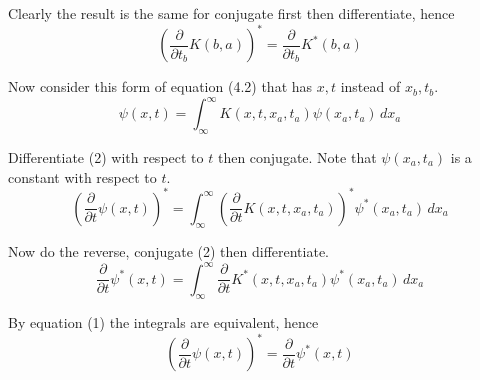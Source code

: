 Clearly the result is the same for conjugate first then differentiate, hence
\begin{equation*}
\left(\frac{\partial}{\partial t_b}K(b,a)\right)^*
=\frac{\partial}{\partial t_b}K^*(b,a)
\tag{1}
\end{equation*}

Now consider this form of equation (4.2) that has $x,t$ instead of $x_b,t_b$.
\begin{equation*}
\psi(x,t)=\int_{\infty}^\infty K(x,t,x_a,t_a)\psi(x_a,t_a)\,dx_a
\tag{2}
\end{equation*}

Differentiate (2) with respect to $t$ then conjugate.
Note that $\psi(x_a,t_a)$ is a constant with respect to $t$.
\begin{equation*}
\left(\frac{\partial}{\partial t}\psi(x,t)\right)^*
=\int_{\infty}^\infty\left(\frac{\partial}{\partial t}K(x,t,x_a,t_a)\right)^*\psi^*(x_a,t_a)\,dx_a
\end{equation*}

Now do the reverse, conjugate (2) then differentiate.
\begin{equation*}
\frac{\partial}{\partial t}\psi^*(x,t)
=\int_{\infty}^\infty\frac{\partial}{\partial t}K^*(x,t,x_a,t_a)\psi^*(x_a,t_a)\,dx_a
\end{equation*}

By equation (1) the integrals are equivalent, hence
\begin{equation*}
\left(\frac{\partial}{\partial t}\psi(x,t)\right)^*=\frac{\partial}{\partial t}\psi^*(x,t)
\end{equation*}


